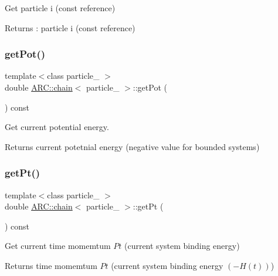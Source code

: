 Get particle i (const reference) 

\begin{DoxyReturn}{Returns}
\+: particle i (const reference) 
\end{DoxyReturn}
\hypertarget{classARC_1_1chain_a9a7b50be2e4a6159d8e2f7ae6dd7cef9}{}\label{classARC_1_1chain_a9a7b50be2e4a6159d8e2f7ae6dd7cef9} 
\subsubsection{\texorpdfstring{get\+Pot()}{getPot()}}
{\footnotesize\ttfamily template$<$class particle\+\_\+ $>$ \\
double \hyperlink{classARC_1_1chain}{A\+R\+C\+::chain}$<$ particle\+\_\+ $>$\+::get\+Pot (\begin{DoxyParamCaption}{ }\end{DoxyParamCaption}) const\hspace{0.3cm}{\ttfamily [inline]}}



Get current potential energy. 

\begin{DoxyReturn}{Returns}
current potetnial energy (negative value for bounded systems) 
\end{DoxyReturn}
\hypertarget{classARC_1_1chain_a67f23a4e326b2fdf40f7c6b270a30fbf}{}\label{classARC_1_1chain_a67f23a4e326b2fdf40f7c6b270a30fbf} 
\subsubsection{\texorpdfstring{get\+Pt()}{getPt()}}
{\footnotesize\ttfamily template$<$class particle\+\_\+ $>$ \\
double \hyperlink{classARC_1_1chain}{A\+R\+C\+::chain}$<$ particle\+\_\+ $>$\+::get\+Pt (\begin{DoxyParamCaption}{ }\end{DoxyParamCaption}) const\hspace{0.3cm}{\ttfamily [inline]}}



Get current time momemtum $Pt$ (current system binding energy) 

\begin{DoxyReturn}{Returns}
time momemtum $Pt$ (current system binding energy $(-H(t))$) 
\end{DoxyReturn}
\hypertarget{classARC_1_1chain_a68f54fe8b09bd61838d6227ff4e533d1}{}\label{classARC_1_1chain_a68f54fe8b09bd61838d6227ff4e533d1} 
